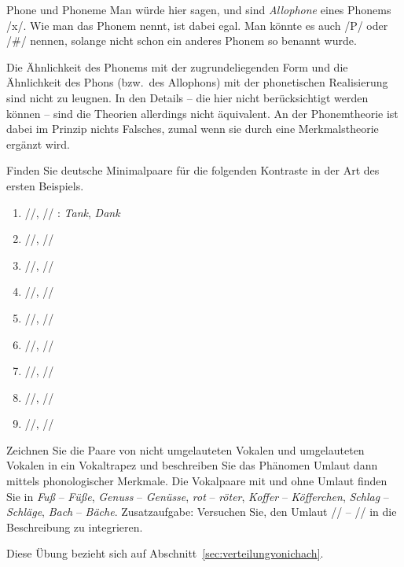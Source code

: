 \begin{Vertiefung}{Phone und Phoneme}
Man würde hier sagen, \textipa{[\c{c}]} und \textipa{[X]} sind \textit{Allophone} eines Phonems /x/.
Wie man das Phonem nennt, ist dabei egal.
Man könnte es auch /P/ oder /\#/ nennen, solange nicht schon ein anderes Phonem so benannt wurde.

Die Ähnlichkeit des Phonems mit der zugrundeliegenden Form und die Ähnlichkeit des Phons (bzw.\ des Allophons) mit der phonetischen Realisierung sind nicht zu leugnen.
In den Details -- die hier nicht berücksichtigt werden können -- sind die Theorien allerdings nicht äquivalent.
An der Phonemtheorie ist dabei im Prinzip nichts Falsches, zumal wenn sie durch eine Merkmalstheorie ergänzt wird.

\end{Vertiefung}


\Uebungen

\Uebung \label{u41} Finden Sie deutsche Minimalpaare für die folgenden Kontraste in der Art des ersten Beispiels.

\begin{enumerate}\Lf
  \item{//, // : \textit{Tank}, \textit{Dank}}
  \item{//, //}
  \item{//, //}
  \item{//, //}
  \item{//, //}
  \item{//, //}
  \item{//, //}
  \item{//, //}
  \item{//, //}
\end{enumerate}

\Uebung \label{u42} Zeichnen Sie die Paare von nicht umgelauteten Vokalen und umgelauteten Vokalen in ein Vokaltrapez und beschreiben Sie das Phänomen Umlaut dann mittels phonologischer Merkmale.
Die Vokalpaare mit und ohne Umlaut finden Sie in \textit{Fuß} -- \textit{Füße}, \textit{Genuss} -- \textit{Genüsse}, \textit{rot} -- \textit{röter}, \textit{Koffer} -- \textit{Köfferchen}, \textit{Schlag} -- \textit{Schläge}, \textit{Bach} -- \textit{Bäche}.
Zusatzaufgabe: Versuchen Sie, den Umlaut // -- // in die Beschreibung zu integrieren.

\Uebung[\tristar] \label{u43} Diese Übung bezieht sich auf Abschnitt~\ref{sec:verteilungvonichach}.

